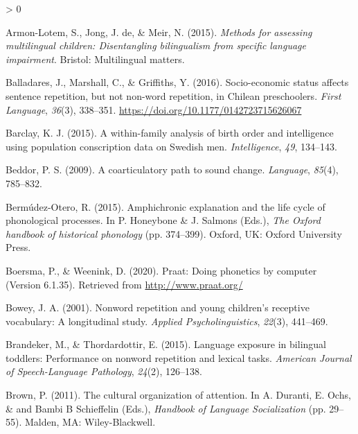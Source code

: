 \documentclass[
  american,
  ,man,floatsintext]{apa6}
\newlength{\cslhangindent}
\newenvironment{CSLReferences}[2] %
 {%
  \setlength{\parindent}{0pt}
  \ifodd #1 \everypar{\setlength{\hangindent}{\cslhangindent}}\ignorespaces\fi
  \ifnum #2 > 0
  \setlength{\parskip}{#2\baselineskip}
  \fi
 }%
 {}
\begin{document}
\hypertarget{refs}{}
\begin{CSLReferences}{1}{0}
\leavevmode\hypertarget{ref-armon2015assessing}{}%
Armon-Lotem, S., Jong, J. de, \& Meir, N. (2015). \emph{Methods for assessing multilingual children: Disentangling bilingualism from specific language impairment}. Bristol: Multilingual matters.

\leavevmode\hypertarget{ref-balladares2016socio}{}%
Balladares, J., Marshall, C., \& Griffiths, Y. (2016). {Socio-economic status affects sentence repetition, but not non-word repetition, in Chilean preschoolers}. \emph{{First Language}}, \emph{36}(3), 338--351. \url{https://doi.org/10.1177/0142723715626067}

\leavevmode\hypertarget{ref-barclay2015within}{}%
Barclay, K. J. (2015). A within-family analysis of birth order and intelligence using population conscription data on {S}wedish men. \emph{Intelligence}, \emph{49}, 134--143.

\leavevmode\hypertarget{ref-beddor2009coarticulatory}{}%
Beddor, P. S. (2009). A coarticulatory path to sound change. \emph{Language}, \emph{85}(4), 785--832.

\leavevmode\hypertarget{ref-bermudezotero2015amphichronic}{}%
Bermúdez-Otero, R. (2015). Amphichronic explanation and the life cycle of phonological processes. In P. Honeybone \& J. Salmons (Eds.), \emph{The {O}xford handbook of historical phonology} (pp. 374--399). Oxford, UK: Oxford University Press.

\leavevmode\hypertarget{ref-Praat}{}%
Boersma, P., \& Weenink, D. (2020). Praat: Doing phonetics by computer (Version 6.1.35). Retrieved from \url{http://www.praat.org/}

\leavevmode\hypertarget{ref-bowey2001nonword}{}%
Bowey, J. A. (2001). Nonword repetition and young children's receptive vocabulary: A longitudinal study. \emph{Applied Psycholinguistics}, \emph{22}(3), 441--469.

\leavevmode\hypertarget{ref-brandeker2015language}{}%
Brandeker, M., \& Thordardottir, E. (2015). Language exposure in bilingual toddlers: Performance on nonword repetition and lexical tasks. \emph{American Journal of Speech-Language Pathology}, \emph{24}(2), 126--138.

\leavevmode\hypertarget{ref-brown2011cultural}{}%
Brown, P. (2011). The cultural organization of attention. In A. Duranti, E. Ochs, \& and Bambi B Schieffelin (Eds.), \emph{Handbook of {Language Socialization}} (pp. 29--55). Malden, MA: Wiley-Blackwell.


\end{CSLReferences}
\end{document}
